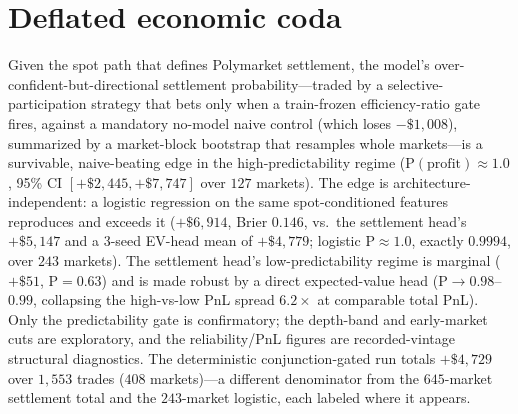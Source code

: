 \documentclass{article}
\begin{document}
\section{Deflated economic coda}\label{app:coda}

Given the spot path that defines Polymarket settlement, the model's
over-confident-but-directional settlement probability---traded by a
selective-participation strategy that bets only when a train-frozen
efficiency-ratio gate fires, against a mandatory no-model naive control (which
loses $-\$1{,}008$), summarized by a market-block bootstrap that resamples whole
markets---is a survivable, naive-beating edge in the high-predictability regime
($\mathrm{P(profit)}\approx1.0$, 95\% CI $[+\$2{,}445,+\$7{,}747]$ over $127$
markets). The edge is architecture-independent: a logistic regression on the same
spot-conditioned features reproduces and exceeds it ($+\$6{,}914$, Brier $0.146$,
vs.\ the settlement head's $+\$5{,}147$ and a 3-seed EV-head mean of $+\$4{,}779$;
logistic $\mathrm{P}\approx1.0$, exactly $0.9994$, over $243$ markets). The
settlement head's low-predictability regime is marginal ($+\$51$,
$\mathrm{P}=0.63$) and is made robust by a direct expected-value head
($\mathrm{P}\to0.98$--$0.99$, collapsing the high-vs-low PnL spread $6.2\times$ at
comparable total PnL). Only the predictability gate is confirmatory; the depth-band
and early-market cuts are exploratory, and the reliability/PnL figures are
recorded-vintage structural diagnostics. The deterministic conjunction-gated run
totals $+\$4{,}729$ over $1{,}553$ trades ($408$ markets)---a different denominator
from the $645$-market settlement total and the $243$-market logistic, each labeled
where it appears.
\end{document}
